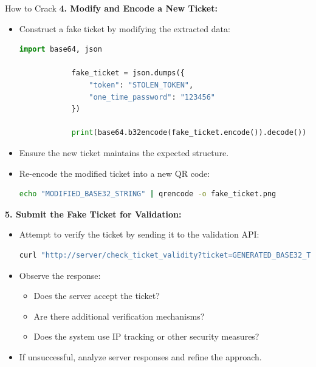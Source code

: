 \documentclass[final,dvipsnames]{beamer}
\newlength{\colwidth}
\begin{document}
\begin{frame}[t, fragile]
\begin{columns}[t]
\begin{column}{\colwidth}
\begin{block}{How to Crack}
        \textbf{4. Modify and Encode a New Ticket:}
        \begin{itemize}
            \item Construct a fake ticket by modifying the extracted data:
            \begin{lstlisting}[language=Python]
            import base64, json

            fake_ticket = json.dumps({
                "token": "STOLEN_TOKEN", 
                "one_time_password": "123456"
            })

            print(base64.b32encode(fake_ticket.encode()).decode())
            \end{lstlisting}
            \item Ensure the new ticket maintains the expected structure.
            \item Re-encode the modified ticket into a new QR code:
            \begin{lstlisting}[language=bash]
            echo "MODIFIED_BASE32_STRING" | qrencode -o fake_ticket.png
            \end{lstlisting}
        \end{itemize}

        \textbf{5. Submit the Fake Ticket for Validation:}
        \begin{itemize}
            \item Attempt to verify the ticket by sending it to the validation API:
            \begin{lstlisting}[language=bash]
            curl "http://server/check_ticket_validity?ticket=GENERATED_BASE32_TICKET"
            \end{lstlisting}
            \item Observe the response:
            \begin{itemize}
                \item Does the server accept the ticket?
                \item Are there additional verification mechanisms?
                \item Does the system use IP tracking or other security measures?
            \end{itemize}
            \item If unsuccessful, analyze server responses and refine the approach.
        \end{itemize}


\end{block}
\end{column}
\end{columns}
\end{frame}
\end{document}
